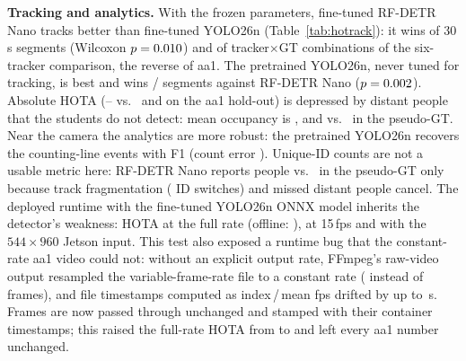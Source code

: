 \documentclass[conference]{IEEEtran}
\newcommand{\yolo}{YOLO26n}
\newcommand{\rfdetr}{RF-DETR Nano}
\begin{document}
\textbf{Tracking and analytics.} With the frozen parameters, fine-tuned \rfdetr{} tracks better than fine-tuned \yolo{}
(Table~\ref{tab:hotrack}): it wins \HoSegWinsRf{} of \HoSegs{} 30\,s segments (Wilcoxon $p=0.010$) and
\HoTcWinsRf{} of \HoTcPairs{} tracker$\times$GT combinations of the six-tracker comparison, the reverse of aa1. The
pretrained \yolo{}, never tuned for tracking, is best and wins \HoSegWinsPt/\HoSegs{} segments against \rfdetr{}
($p=0.002$). Absolute HOTA (\HoBtHotaYoloFtTun--\HoBtHotaYoloPtTun{} vs.\ \BtHotaYoloTun{} and \BtHotaRfTun{} on the aa1 hold-out) is depressed by distant people that the
students do not detect: mean occupancy is \HoAnOccYoloFt, \HoAnOccRfFt{} and \HoAnOccYoloPt{} vs.\ \HoAnGtOcc{} in the
pseudo-GT. Near the camera the analytics are more robust: the pretrained \yolo{} recovers the counting-line events
with F1 \HoAnCrossFoneYoloPt{} (count error \HoAnCrossErrYoloPt). Unique-ID counts are not a usable metric here:
\rfdetr{} reports \HoAnUniqueRfFt{} people vs.\ \HoAnGtUnique{} in the pseudo-GT only because track fragmentation
(\HoBtIdswRfFtTun{} ID switches) and missed distant people cancel.
\ifHaveHeldoutEdge
The deployed runtime with the fine-tuned \yolo{} ONNX model inherits the detector's weakness: HOTA
\HoEdHotaHiSOne{} at the full rate (offline: \HoEdRefHota), \HoEdHotaHiSFour{} at 15\,fps and \HoEdHotaMidSFour{} with
the $544{\times}960$ Jetson input. This test also exposed a runtime bug that the constant-rate aa1 video could not:
without an explicit output rate, FFmpeg's raw-video output resampled the variable-frame-rate file to a constant rate
(\HoVfrDelivered{} instead of \HoVfrFrames{} frames), and file timestamps computed as index\,/\,mean fps drifted by up
to \HoVfrTsErr\,s. Frames are now passed through unchanged and stamped with their container timestamps; this raised
the full-rate HOTA from \HoVfrHotaBefore{} to \HoEdHotaHiSOne{} and left every aa1 number unchanged.
\fi
\fi

\end{document}
